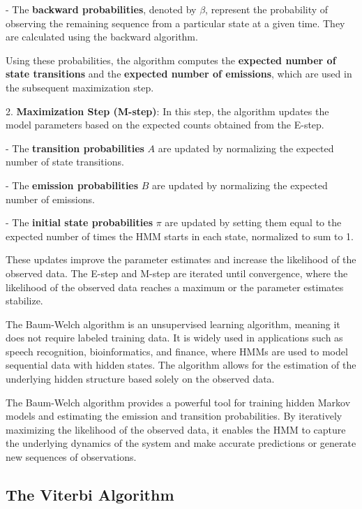 \documentclass[a4paper,11pt]{article}
\begin{document}
   - The \textbf{backward probabilities}, denoted by $\beta$, represent the probability of observing the 
   remaining sequence from a particular state at a given time. They are calculated using the backward 
   algorithm.

   Using these probabilities, the algorithm computes the \textbf{expected number of state transitions} and the 
   \textbf{expected number of emissions}, which are used in the subsequent maximization step.

2. \textbf{Maximization Step (M-step)}: In this step, the algorithm updates the model parameters based on the expected counts obtained from the E-step.

   - The \textbf{transition probabilities} $A$ are updated by normalizing the expected number of state transitions.

   - The \textbf{emission probabilities} $B$ are updated by normalizing the expected number of emissions.

   - The \textbf{initial state probabilities} $\pi$ are updated by setting them equal to the expected number of times the HMM starts in each state, normalized to sum to 1.

   These updates improve the parameter estimates and increase the likelihood of the observed data. The E-step and M-step are iterated until convergence, where the likelihood of the observed data reaches a maximum or the parameter estimates stabilize.

The Baum-Welch algorithm is an unsupervised learning algorithm, meaning it does not require labeled training data. It is widely used in applications such as speech recognition, bioinformatics, and finance, where HMMs are used to model sequential data with hidden states. The algorithm allows for the estimation of the underlying hidden structure based solely on the observed data.

The Baum-Welch algorithm provides a powerful tool for training hidden Markov models and estimating the emission and transition probabilities. By iteratively maximizing the likelihood of the observed data, it enables the HMM to capture the underlying dynamics of the system and make accurate predictions or generate new sequences of observations.

\subsection{The Viterbi Algorithm}
\label{sec:viterbi}
\end{document}
